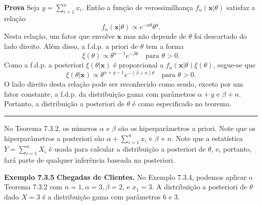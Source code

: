 \vspace{1cm}
\noindent\textbf{Prova} \quad Seja $y=\sum_{i=1}^{n}x_i$. Então a função de verossimilhança $f_n(\mathbf{x}|\theta)$ satisfaz a relação
$$ f_n(\mathbf{x}|\theta) \propto e^{-n\theta}\theta^y. $$
Nesta relação, um fator que envolve $\mathbf{x}$ mas não depende de $\theta$ foi descartado do lado direito. Além disso, a f.d.p. a priori de $\theta$ tem a forma
$$ \xi(\theta) \propto \theta^{\alpha-1}e^{-\beta\theta} \quad \text{para } \theta>0. $$
Como a f.d.p. a posteriori $\xi(\theta|\mathbf{x})$ é proporcional a $f_n(\mathbf{x}|\theta)\xi(\theta)$, segue-se que
$$ \xi(\theta|\mathbf{x}) \propto \theta^{\alpha+y-1}e^{-(\beta+n)\theta} \quad \text{para } \theta>0. $$
O lado direito desta relação pode ser reconhecido como sendo, exceto por um fator constante, a f.d.p. da distribuição gama com parâmetros $\alpha+y$ e $\beta+n$. Portanto, a distribuição a posteriori de $\theta$ é como especificado no teorema. \rule{0.5em}{0.5em}

\vspace{1cm}
No Teorema 7.3.2, os números $\alpha$ e $\beta$ são os hiperparâmetros a priori. Note que os hiperparâmetros a posteriori são $\alpha + \sum_{i=1}^{n}x_i$ e $\beta+n$. Note que a estatística $Y=\sum_{i=1}^{n}X_i$ é usada para calcular a distribuição a posteriori de $\theta$, e, portanto, fará parte de qualquer inferência baseada na posteriori.

\vspace{1cm}
\noindent\textbf{Exemplo 7.3.5} \quad \textbf{Chegadas de Clientes.} No Exemplo 7.3.4, podemos aplicar o Teorema 7.3.2 com $n=1, \alpha=3, \beta=2$, e $x_1=3$. A distribuição a posteriori de $\theta$ dado $X=3$ é a distribuição gama com parâmetros 6 e 3.

